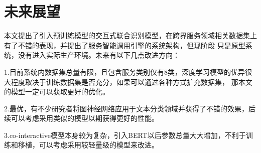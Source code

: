 \section{未来展望}
本文提出了引入预训练模型的交互式联合识别模型，在跨界服务领域相关数据集上有了不错的表现，并提出了服务智能调用引擎的系统架构，但现阶段
只是原型系统，没有进入实际生产环境。未来有以下几点改进方向：

1.目前系统内数据集总量有限，且包含服务类别仅有8类，深度学习模型的优异很大程度取决于训练数据集是否充分，如果可以通过各种方式扩充数据集，
那本文的模型一定可以获取更好的优化。

2.最优，有不少研究者将图神经网络应用于文本分类领域并获得了不错的效果，后续可以考虑采用类似的模型以期获得更好的性能。

3.co-interactive模型本身较为复杂，引入BERT以后参数总量大大增加，不利于训练和移植，可以考虑采用较轻量级的模型来改进。

